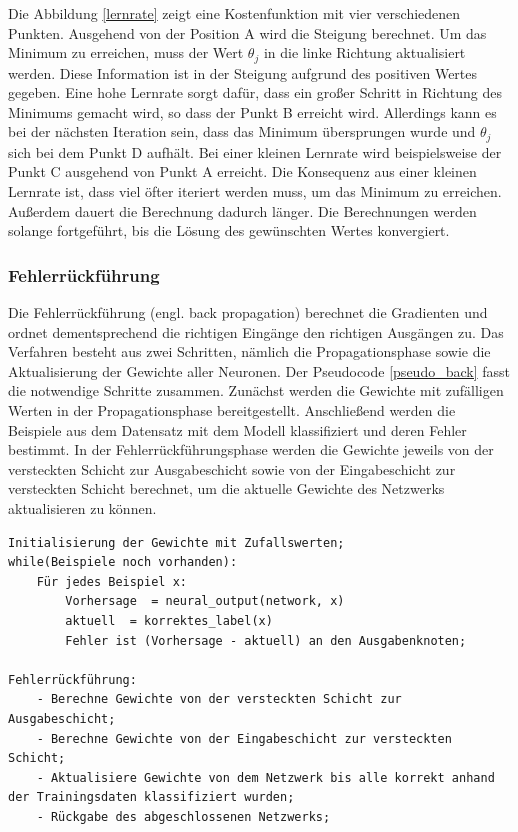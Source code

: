 Die Abbildung \ref{lernrate} zeigt eine Kostenfunktion mit vier verschiedenen Punkten. Ausgehend von der Position A wird die Steigung berechnet. Um das Minimum zu erreichen, muss der Wert $\theta_j$ in die linke Richtung aktualisiert werden. Diese Information ist in der Steigung aufgrund des positiven Wertes gegeben. Eine hohe Lernrate sorgt dafür, dass ein großer Schritt in Richtung des Minimums gemacht wird, so dass der Punkt B erreicht wird. Allerdings kann es bei der nächsten Iteration sein, dass das Minimum übersprungen wurde und $\theta_j$ sich bei dem Punkt D aufhält. Bei einer kleinen Lernrate wird beispielsweise der Punkt C ausgehend von Punkt A erreicht. Die Konsequenz aus einer kleinen Lernrate ist, dass viel öfter iteriert werden muss, um das Minimum zu erreichen. Außerdem dauert die Berechnung dadurch länger. Die Berechnungen werden solange fortgeführt, bis die Lösung des gewünschten Wertes konvergiert.


\subsubsection{Fehlerrückführung}



Die Fehlerrückführung (engl. back propagation) berechnet die Gradienten und ordnet dementsprechend die richtigen Eingänge den richtigen Ausgängen zu. Das Verfahren besteht aus zwei Schritten, nämlich die Propagationsphase sowie die Aktualisierung der Gewichte aller Neuronen. Der Pseudocode \ref{pseudo_back} fasst die notwendige Schritte zusammen. Zunächst werden die Gewichte mit zufälligen Werten in der Propagationsphase bereitgestellt. Anschließend werden die Beispiele aus dem Datensatz mit dem Modell klassifiziert und deren Fehler bestimmt. In der Fehlerrückführungsphase werden die Gewichte jeweils von der versteckten Schicht zur Ausgabeschicht sowie von der Eingabeschicht zur versteckten Schicht berechnet, um die aktuelle Gewichte des Netzwerks aktualisieren zu können\cite{Bell2014}.

\begin{lstlisting}[caption={Der Pseudocode zu dem Fehlerrückführung-Algorihtmus beschreibt die notwendigen Schritte\cite{Bell2014}.}, label=pseudo_back]
Initialisierung der Gewichte mit Zufallswerten;
while(Beispiele noch vorhanden):
	Für jedes Beispiel x:
		Vorhersage  = neural_output(network, x)
		aktuell  = korrektes_label(x)
		Fehler ist (Vorhersage - aktuell) an den Ausgabenknoten;
		
Fehlerrückführung:
	- Berechne Gewichte von der versteckten Schicht zur Ausgabeschicht;
	- Berechne Gewichte von der Eingabeschicht zur versteckten Schicht;
	- Aktualisiere Gewichte von dem Netzwerk bis alle korrekt anhand der Trainingsdaten klassifiziert wurden;
	- Rückgabe des abgeschlossenen Netzwerks;
\end{lstlisting}



